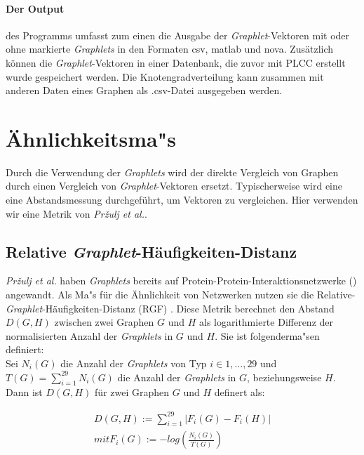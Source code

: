 \documentclass{report}
\begin{document}
\paragraph{Der Output} des Programms umfasst zum einen die Ausgabe der \textit{Graphlet}-Vektoren mit oder ohne markierte \textit{Graphlets} in den Formaten csv, matlab und nova. Zus\"atzlich k\"onnen die \textit{Graphlet}-Vektoren in einer Datenbank, die zuvor mit PLCC erstellt wurde gespeichert werden. Die Knotengradverteilung kann zusammen mit anderen Daten eines Graphen als .csv-Datei ausgegeben werden.


\section{\"Ahnlichkeitsma"s}

Durch die Verwendung der \textit{Graphlets} wird der direkte Vergleich von Graphen durch einen Vergleich von \textit{Graphlet}-Vektoren ersetzt. Typischerweise wird eine eine Abstandsmessung durchgef\"uhrt, um Vektoren zu vergleichen. Hier verwenden wir eine Metrik von \textit{Pr\v{z}ulj et al.}.



\subsection{Relative \textit{Graphlet}-H\"aufigkeiten-Distanz}

\textit{Pr\v{z}ulj et al.} haben \textit{Graphlets} bereits auf Protein-Protein-Interaktionsnetzwerke (\cite{frqdistribution}) angewandt. Als Ma"s f\"ur die \"Ahnlichkeit von Netzwerken nutzen sie die Relative-\textit{Graphlet}-H\"aufigkeiten-Distanz (RGF) . Diese Metrik berechnet den Abstand $D(G,H)$ zwischen zwei Graphen $G$ und $H$ als logarithmierte Differenz der normalisierten Anzahl der \textit{Graphlets} in $G$ und $H$. Sie ist folgenderma"sen definiert: \\

Sei $N_{i}(G)$ die Anzahl der \textit{Graphlets} von Typ $i \in {1,...,29}$ und \\ $T(G) = \sum_{i = 1}^{29} N_{i}(G)$ die Anzahl der \textit{Graphlets} in $G$, beziehungsweise $H$.\\

Dann ist $D(G,H)$ f\"ur zwei Graphen $G$ und $H$ definert als:

\begin{subequations}
\begin{align}
D(G,H) := \sum_{i = 1}^{29} | F_{i}(G) - F_{i}(H) | \\
mit F_{i}(G) := - log(\frac{N_{i}(G)}{T(G)})
\end{align}
\end{subequations}
\end{document}
